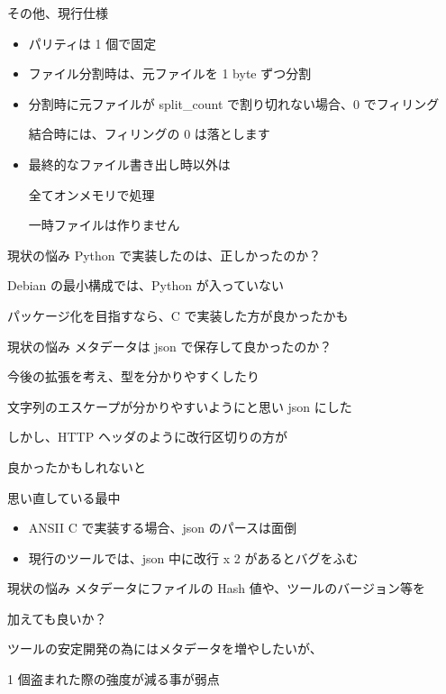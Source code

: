\begin{frame}{その他、現行仕様}{}
  \begin{itemize}
  \item パリティは 1 個で固定
  \item ファイル分割時は、元ファイルを 1 byte ずつ分割
  \item 分割時に元ファイルが split\_count で割り切れない場合、0 でフィリング

    結合時には、フィリングの 0 は落とします
  \item 最終的なファイル書き出し時以外は

    全てオンメモリで処理

    一時ファイルは作りません
  \end{itemize}
\end{frame}

\begin{frame}{現状の悩み}{}
  Python で実装したのは、正しかったのか？
  \vspace{1cm}

  Debian の最小構成では、Python が入っていない

  パッケージ化を目指すなら、C で実装した方が良かったかも
\end{frame}

\begin{frame}{現状の悩み}{}
  メタデータは json で保存して良かったのか？
  \vspace{1cm}

  今後の拡張を考え、型を分かりやすくしたり 

  文字列のエスケープが分かりやすいようにと思い json にした

  しかし、HTTP ヘッダのように改行区切りの方が

  良かったかもしれないと

  思い直している最中

  \begin{itemize}
  \item ANSII C で実装する場合、json のパースは面倒
  \item 現行のツールでは、json 中に改行 x 2 があるとバグをふむ
  \end{itemize}
\end{frame}

\begin{frame}{現状の悩み}{}
  メタデータにファイルの Hash 値や、ツールのバージョン等を

  加えても良いか？
  \vspace{1cm}

  ツールの安定開発の為にはメタデータを増やしたいが、

  1 個盗まれた際の強度が減る事が弱点
\end{frame}


